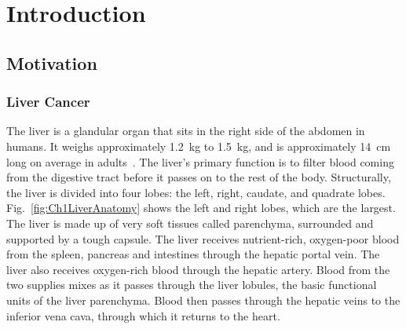 \chapter{Introduction}

\section{Motivation}

\subsection{Liver Cancer}
The liver is a glandular organ that sits in the right side of the abdomen in humans. It weighs approximately 1.2~kg to 1.5~kg, and is approximately 14~cm long on average in adults~\cite{Wolf1990,Kratzer2003}. The liver's primary function is to filter blood coming from the digestive tract before it passes on to the rest of the body. Structurally, the liver is divided into four lobes: the left, right, caudate, and quadrate lobes. Fig.~\ref{fig:Ch1LiverAnatomy} shows the left and right lobes, which are the largest. The liver is made up of very soft tissues called parenchyma, surrounded and supported by a tough capsule. The liver receives nutrient-rich, oxygen-poor blood from the spleen, pancreas and intestines through the hepatic portal vein. The liver also receives oxygen-rich blood through the hepatic artery. Blood from the two supplies mixes as it passes through the liver lobules, the basic functional units of the liver parenchyma. Blood then passes through the hepatic veins to the inferior vena cava, through which it returns to the heart.

